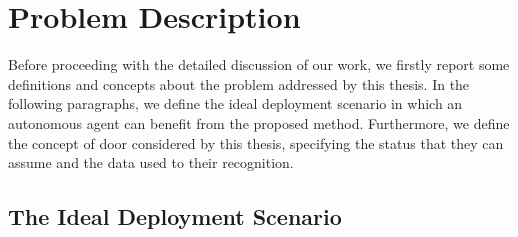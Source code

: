 \section{Problem Description}

Before proceeding with the detailed discussion of our work, we firstly report some definitions and concepts about the problem addressed by this thesis. In the following paragraphs, we define the ideal deployment scenario in which an autonomous agent can benefit from the proposed method. Furthermore, we define the concept of door considered by this thesis, specifying the status that they can assume and the data used to their recognition.

\subsection{The Ideal Deployment Scenario}

